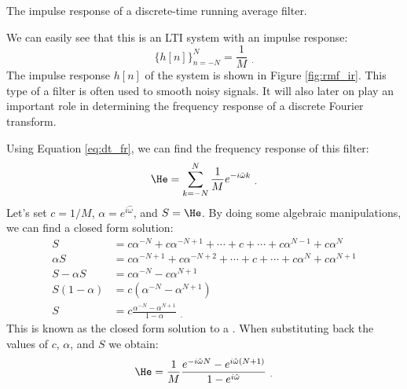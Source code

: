 \begin{marginfigure}
\begin{center}
\end{center}
\caption{The impulse response of a discrete-time running average filter.}
\label{fig:rmf_ir}
\end{marginfigure}

We can easily see that this is an LTI system with an impulse response:
\begin{equation}
\{h[n]\}_{n=-N}^{N} = \frac{1}{M} \,\, _.
\end{equation}
The impulse response $h[n]$ of the system is shown in
Figure \ref{fig:rmf_ir}. This type of a filter is often used to smooth
noisy signals. It will also later on play an important role in
determining the frequency response of a discrete Fourier transform.

Using Equation \ref{eq:dt_fr}, we can find the frequency response of this filter:
\begin{equation}
\He = \sum_{k=-N}^N \frac{1}{M} e^{-i\hat{\omega}k} \,\, _.
\end{equation}
Let's set $c=1/M$, $\alpha=e^{i\hat{\omega}}$, and $S=\He$. By doing
some algebraic manipulations, we can find a closed form solution:
\begin{align}
S &= c \alpha^{-N} + c \alpha^{-N+1} + \cdots+ c +\cdots + c \alpha^{N-1} + c\alpha^N \\
\alpha S &= c \alpha^{-N+1} + c \alpha^{-N+2} + \cdots+ c +\cdots + c \alpha^{N} + c\alpha^{N+1} \\
S-\alpha S &= c\alpha^{-N} - c\alpha^{N+1}\\
S(1-\alpha) &= c(\alpha^{-N}-\alpha^{N+1})\\
S &= c \frac{\alpha^{-N} - \alpha^{N+1}}{1-\alpha} \,\, _.
\label{eq:gs_sol_form}
\end{align}
This is known as the closed form solution to a \emph{}. When substituting back the values of $c$,
$\alpha$, and $S$ we obtain:
\begin{equation}
\He = \frac{1}{M} \frac{e^{-i\hat{\omega}N}-e^{i \hat{\omega}(N+1)}}{1-e^{i\hat{\omega}}} \,\, _.
\end{equation}

